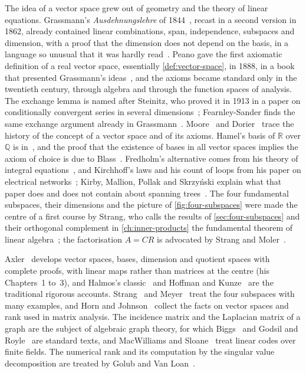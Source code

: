 The idea of a vector space grew out of geometry and the theory of linear equations. Grassmann's \emph{Ausdehnungslehre} of 1844~\cite{grassmann1844}, recast in a second version in 1862, already contained linear combinations, span, independence, subspaces and dimension, with a proof that the dimension does not depend on the basis, in a language so unusual that it was hardly read~\cite{fearnleysander1979}. Peano gave the first axiomatic definition of a real vector space, essentially \cref{def:vector-space}, in 1888, in a book that presented Grassmann's ideas~\cite{peano1888}, and the axioms became standard only in the twentieth century, through algebra and through the function spaces of analysis. The exchange lemma is named after Steinitz, who proved it in 1913 in a paper on conditionally convergent series in several dimensions~\cite{steinitz1913}; Fearnley-Sander finds the same exchange argument already in Grassmann~\cite{fearnleysander1979}. Moore~\cite{moore1995} and Dorier~\cite{dorier1995} trace the history of the concept of a vector space and of its axioms. Hamel's basis of $\mathbb R$ over $\mathbb Q$ is in~\cite{hamel1905}, and the proof that the existence of bases in all vector spaces implies the axiom of choice is due to Blass~\cite{blass1984}. Fredholm's alternative comes from his theory of integral equations~\cite{fredholm1903}, and Kirchhoff's laws and his count of loops from his paper on electrical networks~\cite{kirchhoff1847}; Kirby, Mallion, Pollak and Skrzy\'nski explain what that paper does and does not contain about spanning trees~\cite{kirby2016}. The four fundamental subspaces, their dimensions and the picture of \cref{fig:four-subspaces} were made the centre of a first course by Strang, who calls the results of \cref{sec:four-subspaces} and their orthogonal complement in \cref{ch:inner-products} the fundamental theorem of linear algebra~\cite{strang1993,strang2016}; the factorisation $A=CR$ is advocated by Strang and Moler~\cite{strang2022}.

Axler~\cite{axler2024} develops vector spaces, bases, dimension and quotient spaces with complete proofs, with linear maps rather than matrices at the centre (his Chapters~1 to~3), and Halmos's classic~\cite{halmos1958} and Hoffman and Kunze~\cite{hoffman1971} are the traditional rigorous accounts. Strang~\cite[Chap.~3]{strang2016} and Meyer~\cite[Chap.~4]{meyer2000} treat the four subspaces with many examples, and Horn and Johnson~\cite[Sects.~0.1 to~0.4]{horn2013} collect the facts on vector spaces and rank used in matrix analysis. The incidence matrix and the Laplacian matrix of a graph are the subject of algebraic graph theory, for which Biggs~\cite{biggs1993} and Godsil and Royle~\cite{godsil2001} are standard texts, and MacWilliams and Sloane~\cite{macwilliams1977} treat linear codes over finite fields. The numerical rank and its computation by the singular value decomposition are treated by Golub and Van Loan~\cite{golub2013}.

\chapterreferences
